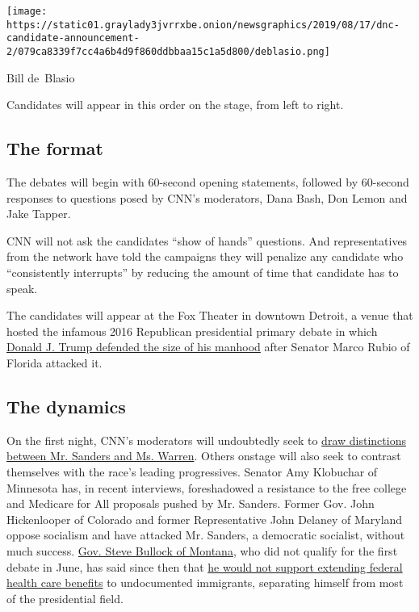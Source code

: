 \texttt{[image: https://static01.graylady3jvrrxbe.onion/newsgraphics/2019/08/17/dnc-candidate-announcement-2/079ca8339f7cc4a6b4d9f860ddbbaa15c1a5d800/deblasio.png]}

Bill de~Blasio

Candidates will appear in this order on the stage, from left to right.

\hypertarget{the-format}{%
\subsection{The format}\label{the-format}}

The debates will begin with 60-second opening statements, followed by
60-second responses to questions posed by CNN's moderators, Dana Bash,
Don Lemon and Jake Tapper.

CNN will not ask the candidates ``show of hands'' questions. And
representatives from the network have told the campaigns they will
penalize any candidate who ``consistently interrupts'' by reducing the
amount of time that candidate has to speak.

The candidates will appear at the Fox Theater in downtown Detroit, a
venue that hosted the infamous 2016 Republican presidential primary
debate in which
\href{https://www.nytimes3xbfgragh.onion/2016/03/04/us/politics/republican-debate.html}{Donald
J. Trump defended the size of his manhood} after Senator Marco Rubio of
Florida attacked it.

\hypertarget{the-dynamics}{%
\subsection{The dynamics}\label{the-dynamics}}

On the first night, CNN's moderators will undoubtedly seek to
\href{https://www.nytimes3xbfgragh.onion/2019/07/30/us/politics/bernie-sanders-elizabeth-warren.html}{draw
distinctions between Mr. Sanders and Ms. Warren}. Others onstage will
also seek to contrast themselves with the race's leading progressives.
Senator Amy Klobuchar of Minnesota has, in recent interviews,
foreshadowed a resistance to the free college and Medicare for All
proposals pushed by Mr. Sanders. Former Gov. John Hickenlooper of
Colorado and former Representative John Delaney of Maryland oppose
socialism and have attacked Mr. Sanders, a democratic socialist, without
much success.
\href{https://www.nytimes3xbfgragh.onion/2019/07/30/us/politics/steve-bullock-debate.html}{Gov.
Steve Bullock of Montana}, who did not qualify for the first debate in
June, has said since then that
\href{https://abcnews.go.com/Politics/steve-bullock-providing-health-care-undocumented-immigrants/story?id=64250125}{he
would not support extending federal health care benefits} to
undocumented immigrants, separating himself from most of the
presidential field.

